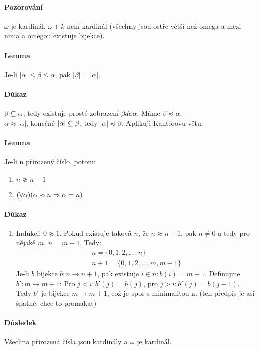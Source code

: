 \documentclass[a4paper,12pt,titlepage]{article}
\begin{document}
\begin{enumerate}
\paragraph{Pozorování}
$\omega$ je kardinál. $\omega + k$ není kardinál (všechny jsou ostře větší než
omega a mezi nima a omegou existuje bijekce).
\paragraph{Lemma}
 Je-li $|\alpha| \le \beta \le \alpha$, pak $|\beta| = |\alpha|$.
\paragraph{Důkaz}
$\beta\subseteq \alpha$, tedy existuje prosté zobrazení $\beta do \alpha$. Máme
$\beta \preceq \alpha$. \\
$\alpha \approx |\alpha|$, konečně $|\alpha| \subseteq \beta$, tedy $|\alpha| \preceq
\beta$. Aplikuji Kantorovu větu.
\paragraph{Lemma}
Je-li n přirozený číslo, potom:
\begin{enumerate}
	\item $n \napprox n+1$
	\item $(\forall \alpha)(\alpha \approx n \Rightarrow \alpha = n)$
\end{enumerate}
\paragraph{Důkaz}
\begin{enumerate}
	\item Indukcí: $0 \napprox 1$. Pokud existuje taková $n$, že $n\approx n+1$,
	pak $n \neq 0$ a tedy pro nějaké $m$, $n = m+1$. Tedy:
	\begin{align}
		n = \{0, 1, 2, ..., n\} \\
		n+1 = \{0, 1, 2, ..., m, m+1 \}
	\end{align}
	Je-li $b$ bijekce $b: n \to n+1$, pak existuje $i \in n: b(i) = m+1$.
	Definujme $b': m \to m+1$: Pro $j < i: b'(j) = b(j)$, pro $j > i: b'(j) =
	b(j-1)$. Tedy $b'$ je bijekce $m\to m+1$, což je spor s minimalitou n. (ten
	předpis je asi špatně, chce to promakat)
\end{enumerate}
\paragraph{Důsledek}
Všechna přirozená čísla jsou kardinály a $\omega$ je kardinál.

\end{enumerate}
\end{document}
